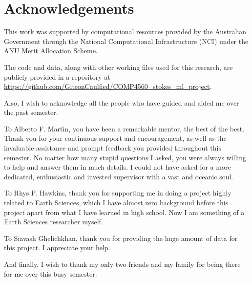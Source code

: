 \chapter*{Acknowledgements}

This work was supported by computational resources provided by the Australian Government through the National Computational Infrastructure (NCI) under the ANU Merit Allocation Scheme.

The code and data, along with other working files used for this research, are publicly provided in a repository at \url{https://github.com/GiteonCaulfied/COMP4560_stokes_ml_project}.

Also, I wish to acknowledge all the people who have guided and aided me over the past semester.

To Alberto F. Mart\'{\i}n, you have been a remarkable mentor, the best of the best. Thank you for your continuous support and encouragement, as well as the invaluable assistance and prompt feedback you provided throughout this semester. No matter how many stupid questions I asked, you were always willing to help and answer them in much details. I could not have asked for a more dedicated, enthusiastic and invested supervisor with a vast and oceanic soul.

To Rhys P. Hawkins, thank you for supporting me in doing a project highly related to Earth Sciences, which I have almost zero background before this project apart from what I have learned in high school. Now I am something of a Earth Sciences researcher myself.

To Siavash Ghelichkhan, thank you for providing the huge amount of data for this project. I appreciate your help.

And finally, I wish to thank my only two friends and my family for being there for me over this busy semester.

